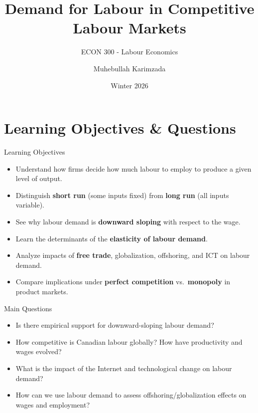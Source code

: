 \documentclass[aspectratio=169]{beamer}
\title{\textbf{Demand for Labour in Competitive Labour Markets \vspace{.5cm}\\  }}
\subtitle{ {\large ECON 300 - Labour Economics}}
\author{Muhebullah Karimzada}
\date{Winter 2026}
\begin{document}
\begin{frame}[plain]
  \titlepage
 
\end{frame}

\section{Learning Objectives \& Questions}

\begin{frame}{Learning Objectives}
\transfade
\begin{itemize}[<+->]
  \item Understand how firms decide how much labour to employ to produce a given level of output.
  \item Distinguish \textbf{short run} (some inputs fixed) from \textbf{long run} (all inputs variable).
  \item See why labour demand is \textbf{downward sloping} with respect to the wage.
    \item Learn the determinants of the \textbf{elasticity of labour demand}.
  \item Analyze impacts of \textbf{free trade}, globalization, offshoring, and ICT on labour demand.
  \item Compare implications under \textbf{perfect competition} vs.\ \textbf{monopoly} in product markets.
\end{itemize}
\end{frame}


\begin{frame}{Main Questions}
\transfade
\begin{itemize}[<+->]
  \item Is there empirical support for downward-sloping labour demand?
  \item How competitive is Canadian labour globally? How have productivity and wages evolved?
  \item What is the impact of the Internet and technological change on labour demand?
  \item How can we use labour demand to assess offshoring/globalization effects on wages and employment?
\end{itemize}
\end{frame}
\end{document}
